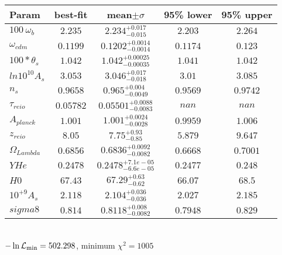 \begin{tabular}{|l|c|c|c|c|} 
 \hline 
Param & best-fit & mean$\pm\sigma$ & 95\% lower & 95\% upper \\ \hline 
$100~\omega{}_{b }$ &$2.235$ & $2.234_{-0.015}^{+0.017}$ & $2.203$ & $2.264$ \\ 
$\omega{}_{cdm }$ &$0.1199$ & $0.1202_{-0.0014}^{+0.0014}$ & $0.1174$ & $0.123$ \\ 
$100*\theta{}_{s }$ &$1.042$ & $1.042_{-0.00035}^{+0.00025}$ & $1.041$ & $1.042$ \\ 
$ln10^{10}A_{s }$ &$3.053$ & $3.046_{-0.018}^{+0.017}$ & $3.01$ & $3.085$ \\ 
$n_{s }$ &$0.9658$ & $0.965_{-0.0049}^{+0.004}$ & $0.9569$ & $0.9742$ \\ 
$\tau{}_{reio }$ &$0.05782$ & $0.05501_{-0.0083}^{+0.0088}$ & $nan$ & $nan$ \\ 
$A_{planck }$ &$1.001$ & $1.001_{-0.0028}^{+0.0024}$ & $0.9959$ & $1.006$ \\ 
$z_{reio }$ &$8.05$ & $7.75_{-0.85}^{+0.93}$ & $5.879$ & $9.647$ \\ 
$\Omega{}_{Lambda }$ &$0.6856$ & $0.6836_{-0.0082}^{+0.0092}$ & $0.6668$ & $0.7001$ \\ 
$YHe$ &$0.2478$ & $0.2478_{-6.6e-05}^{+7.1e-05}$ & $0.2477$ & $0.248$ \\ 
$H0$ &$67.43$ & $67.29_{-0.62}^{+0.63}$ & $66.07$ & $68.5$ \\ 
$10^{+9}A_{s }$ &$2.118$ & $2.104_{-0.036}^{+0.036}$ & $2.027$ & $2.185$ \\ 
$sigma8$ &$0.814$ & $0.8118_{-0.0082}^{+0.008}$ & $0.7948$ & $0.829$ \\ 
\hline 
 \end{tabular} \\ 
$-\ln{\cal L}_\mathrm{min} =502.298$, minimum $\chi^2=1005$ \\ 
